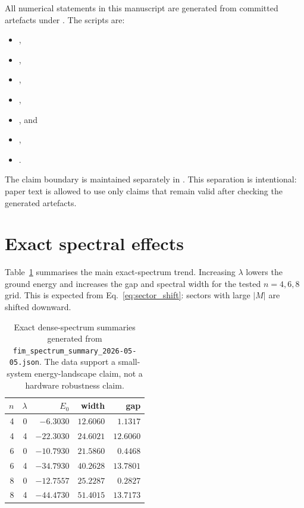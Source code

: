 \documentclass[preprint,aps,physrev,superscriptaddress,floatfix,longbibliography]{revtex4-2}
\begin{document}
All numerical statements in this manuscript are generated from committed artefacts
under . The scripts are:
%
\begin{itemize}
  \item {},
  \item {},
  \item {},
  \item {},
  \item {}, and
  \item {},
  \item {}.
\end{itemize}
%
The claim boundary is maintained separately in
. This separation is
intentional: paper text is allowed to use only claims that remain valid after
checking the generated artefacts.

\section{Exact spectral effects}

Table~\ref{tab:spectrum} summarises the main exact-spectrum trend. Increasing
$\lambda$ lowers the ground energy and increases the gap and spectral width
for the tested $n=4,6,8$ grid. This is expected from
Eq.~\eqref{eq:sector_shift}: sectors with large $|M|$ are shifted downward.

\begin{table}[tb]
\centering
\small
\begin{tabular}{rrrrr}
\toprule
$n$ & $\lambda$ & $E_0$ & width & gap \\
\midrule
4 & 0 & $-6.3030$ & $12.6060$ & $1.1317$ \\
4 & 4 & $-22.3030$ & $24.6021$ & $12.6060$ \\
6 & 0 & $-10.7930$ & $21.5860$ & $0.4468$ \\
6 & 4 & $-34.7930$ & $40.2628$ & $13.7801$ \\
8 & 0 & $-12.7557$ & $25.2287$ & $0.2827$ \\
8 & 4 & $-44.4730$ & $51.4015$ & $13.7173$ \\
\bottomrule
\end{tabular}
\caption{Exact dense-spectrum summaries generated from
\texttt{fim\_spectrum\_summary\_2026-05-05.json}. The data support a
small-system energy-landscape claim, not a hardware robustness claim.}
\label{tab:spectrum}
\end{table}
\end{document}
